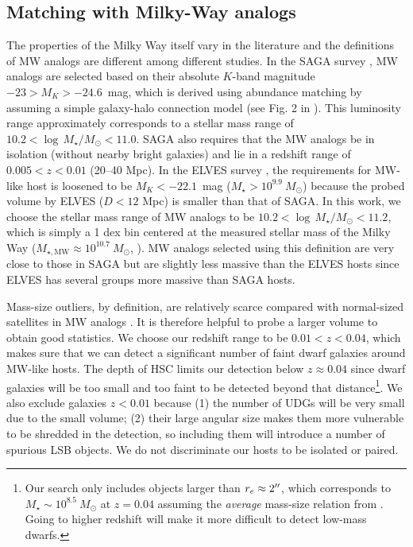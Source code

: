 \documentclass[twocolumn,astrosymb,twocolappendix]{aastex631}
\begin{document}
\begin{CJK*}{UTF8}{gbsn}
\subsection{Matching with Milky-Way analogs}\label{sec:match}
The properties of the Milky Way itself vary in the literature \citep{Licquia2015,Bland-Hawthorn2016} and the definitions of MW analogs are different among different studies. In the SAGA survey \citep{SAGA-I,SAGA-II}, MW analogs are selected based on their absolute $K$-band magnitude $-23 > M_K > -24.6$~mag, which is derived using abundance matching by assuming a simple galaxy-halo connection model (see Fig. 2 in \citealt{SAGA-I}). This luminosity range approximately corresponds to a stellar mass range of $10.2 < \log\, M_\star/M_\odot < 11.0$. SAGA also requires that the MW analogs be in isolation (without nearby bright galaxies) and lie in a redshift range of $0.005 < z < 0.01$ (20--40 Mpc). In the ELVES survey \citep{ELVES-I,ELVES-II,CarlstenELVES2022}, the requirements for MW-like host is loosened to be $M_K < -22.1$~mag ($M_\star > 10^{9.9}\ M_\odot$) because the probed volume by ELVES ($D<12$ Mpc) is smaller than that of SAGA. In this work, we choose the stellar mass range of MW analogs to be $10.2 < \log\, M_\star/M_\odot < 11.2$, which is simply a 1 dex bin centered at the measured stellar mass of the Milky Way ($M_{\star, \mathrm{MW}}\approx 10^{10.7}\ M_\odot$, \citealt{Licquia2015}). MW analogs selected using this definition are very close to those in SAGA but are slightly less massive than the ELVES hosts since ELVES has several groups more massive than SAGA hosts.

Mass-size outliers, by definition, are relatively scarce compared with normal-sized satellites in MW analogs \citep{SAGA-II,CarlstenELVES2022}. It is therefore helpful to probe a larger volume to obtain good statistics. We choose our redshift range to be $0.01 < z < 0.04$, which makes sure that we can detect a significant number of faint dwarf galaxies around MW-like hosts. The depth of HSC limits our detection below $z \approx 0.04$ since dwarf galaxies will be too small and too faint to be detected beyond that distance\footnote{Our search only includes objects larger than $r_e\approx 2\mbox{$^{\prime\prime}$}$, which corresponds to $M_\star \sim 10^{8.5}\ M_\odot$ at $z=0.04$ assuming the \textit{average} mass-size relation from \citet{ELVES-I}. Going to higher redshift will make it more difficult to detect low-mass dwarfs.}. We also exclude galaxies $z<0.01$ because (1) the number of UDGs will be very small due to the small volume; (2) their large angular size makes them more vulnerable to be shredded in the detection, so including them will introduce a number of spurious LSB objects. We do not discriminate our hosts to be isolated or paired.


\end{CJK*}
\end{document}
